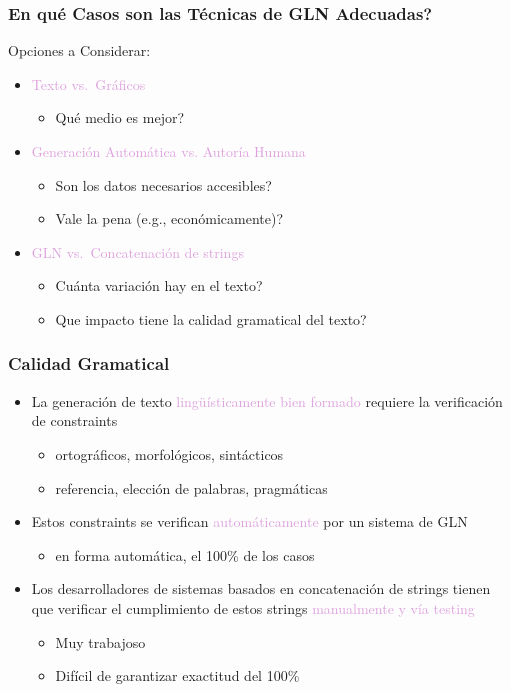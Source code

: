 \documentclass[compress,color=usenames]{beamer}
\newcommand{\mH}[1]{\textcolor{Plum}{#1}}
\begin{document}
\begin{frame}
\frametitle{En qu\'e Casos son las T\'ecnicas de GLN Adecuadas?}

Opciones a Considerar:

\begin{itemize}
\item { \mH{Texto vs.\ Gr\'aficos}}
\begin{itemize}
\item Qu\'e medio es mejor?
\end{itemize}
\item { \mH{Generaci\'on Autom\'atica vs. Autor\'ia Humana}}
\begin{itemize}
\item Son los datos necesarios accesibles? 
\item Vale la pena (e.g., econ\'omicamente)?
\end{itemize}
\item { \mH{GLN vs.\ Concatenaci\'on de strings}}
\begin{itemize}
\item Cu\'anta variaci\'on hay en el texto?
\item Que impacto tiene la calidad gramatical del texto? 
\end{itemize}
\end{itemize}

\end{frame}

\begin{frame}
\frametitle{Calidad Gramatical}

\begin{itemize}
\item La generaci\'on de texto \mH{ling\"u\'isticamente bien formado} requiere la verificaci\'on de constraints
\begin{itemize}
\item ortogr\'aficos, morfol\'ogicos, sint\'acticos
\item referencia, elecci\'on de palabras, pragm\'aticas
\end{itemize}
\item Estos constraints se verifican \mH{autom\'aticamente} por un sistema de GLN
\begin{itemize}
\item en forma autom\'atica, el 100\% de los casos
\end{itemize}
\item Los desarrolladores de sistemas basados en concatenaci\'on de strings tienen que verificar
 el cumplimiento de estos strings \mH{manualmente y v\'ia testing}
\begin{itemize}
\item Muy trabajoso
\item Dif\'icil de garantizar exactitud del 100\%
\end{itemize}
\end{itemize}

\end{frame}
\end{document}
